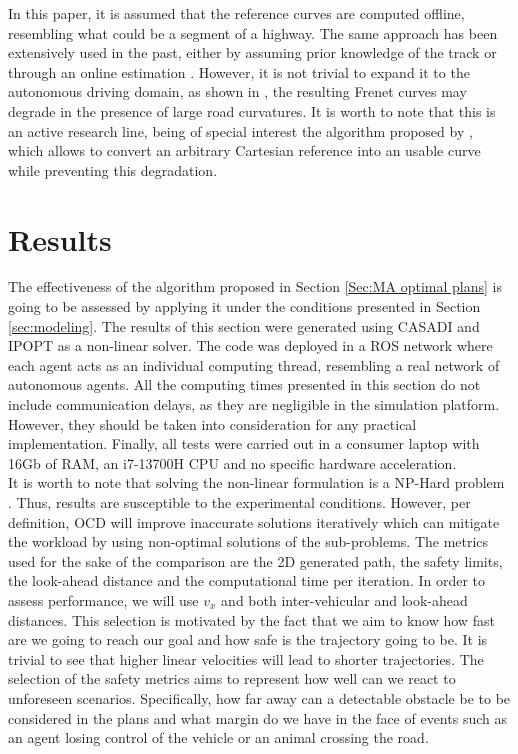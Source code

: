 \documentclass[letterpaper, 10 pt, conference]{ieeeconf}  %
\begin{document}
In this paper, it is assumed that the reference curves are computed offline, resembling what could be a segment of a highway. The same approach has been extensively used in the past, either by assuming prior knowledge of the track \cite{alcala2020lpv} or through an online estimation \cite{Kabzan2019}. However, it is not trivial to expand it to the autonomous driving domain, as shown in \cite{li2020fast}, the resulting Frenet curves may degrade in the presence of large road curvatures. It is worth to note that this is an active research line, being of special interest the algorithm proposed by \cite{Sun2020}, which allows to convert an arbitrary Cartesian reference into an usable curve while preventing this degradation. 



\section{Results}
\label{sec:results}
The effectiveness of the algorithm proposed in Section \ref{Sec:MA optimal plans} is going to be assessed by applying it under the conditions presented in Section \ref{sec:modeling}. The results of this section were generated using CASADI \cite{Casadi} and IPOPT \cite{wachter2006implementation} as a non-linear solver. The code was deployed in a ROS network where each agent acts as an individual computing thread, resembling a real network of autonomous agents. All the computing times presented in this section do not include communication delays, as they are negligible in the simulation platform. However, they should be taken into consideration for any practical implementation. Finally, all tests were carried out in a consumer laptop with 16Gb of RAM, an i7-13700H CPU and no specific hardware acceleration.\\ 

It is worth to note that solving the non-linear formulation is a NP-Hard problem \cite{nl_time}. Thus, results are susceptible to the experimental conditions. However, per definition, OCD will improve inaccurate solutions iteratively which can mitigate the workload by using non-optimal solutions of the sub-problems. The metrics used for the sake of the comparison are the 2D generated path, the safety limits, the look-ahead distance and the computational time per iteration.   In order to assess performance, we will use $v_x$ and both inter-vehicular and look-ahead distances. This selection is motivated by the fact that we aim to know how fast are we going to reach our goal and how safe is the trajectory going to be. It is trivial to see that higher linear velocities will lead to shorter trajectories. The selection of the safety metrics aims to represent how well can we react to unforeseen scenarios. Specifically, how far away can a detectable obstacle be to be considered in the plans and what margin do we have in the face of events such as an agent losing control of the vehicle or an animal crossing the road.\\
\end{document}
